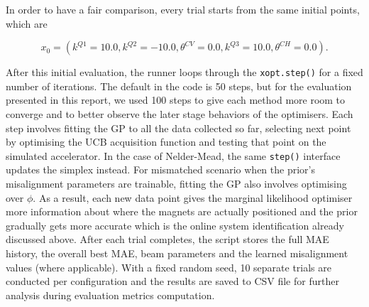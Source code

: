 In order to have a fair comparison, every trial starts from the same initial points, which are

\begin{equation}
    x_{0} = (k^{Q1}=10.0, k^{Q2}=-10.0, \theta^{CV} = 0.0, k^{Q3} = 10.0, \theta^{CH} = 0.0).
\end{equation}

After this initial evaluation, the runner loops through the \texttt{xopt.step()} for a fixed number of iterations. 
The default in the code is 50 steps, but for the evaluation presented in this report, we used 100 steps to give each 
method more room to converge and to better observe the later stage behaviors of the optimisers. Each step involves 
fitting the GP to all the data collected so far, selecting next point by optimising the UCB acquisition function 
and testing that point on the simulated accelerator. In the case of Nelder-Mead, the same \texttt{step()} interface 
updates the simplex instead. For mismatched scenario when the prior’s misalignment parameters are trainable, fitting 
the GP also involves optimising over \textbf{$\phi$}. As a result, each new data point gives the marginal likelihood 
optimiser more information about where the magnets are actually positioned and the prior gradually gets more accurate 
which is the online system identification already discussed above. After each trial completes, the script stores the 
full MAE history, the overall best MAE, beam parameters and the learned misalignment values (where applicable). With a fixed random seed, 
10 separate trials are conducted per configuration and the results are saved to CSV file for further analysis during evaluation metrics computation. 


